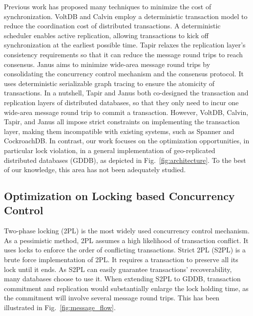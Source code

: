 \documentclass[conference]{IEEEtran}
\begin{document}
Previous work has proposed many techniques
to minimize the cost of synchronization.
VoltDB \cite{VoltDB} and Calvin \cite{Calvin:conf/sigmod/ThomsonDWRSA12} employ a deterministic transaction model
to reduce the coordination cost of distributed transactions.
A deterministic scheduler enables active replication, allowing transactions to kick off synchronization at the earliest possible time.
Tapir \cite{Tapir:conf/sosp/ZhangSSKP15} relaxes the replication layer's consistency requirements so that it can reduce the message round trips to reach consensus.
Janus \cite{Janus:conf/osdi/MuNLL16} aims to minimize wide-area message round trips
by consolidating the concurrency control mechanism and the consensus protocol.
It uses deterministic serializable graph tracing to ensure the atomicity of transactions.
In a nutshell, Tapir and Janus both co-designed the transaction and replication layers of distributed databases, so that they only need to incur one wide-area message round trip to commit a transaction.
However, VoltDB, Calvin, Tapir, and Janus all impose strict constraints on implementing the transaction layer, making them incompatible with existing systems, such as Spanner and CockroachDB.
In contrast, our work focuses on the optimization opportunities, in particular lock violation, in a general implementation of geo-replicated distributed databases (GDDB), as depicted in Fig.~\ref{fig:architecture}.
To the best of our knowledge, this area has not been adequately studied.

\subsection{Optimization on Locking based Concurrency Control}
Two-phase locking (2PL) is the most widely used concurrency control mechanism.
As a pessimistic method, 2PL assumes a high likelihood of transaction conflict.
It uses locks to enforce the order of conflicting transactions.
Strict 2PL (S2PL) is a brute force implementation of 2PL.
It requires a transaction to preserve all its lock until it ends.
As S2PL can easily guarantee transactions' recoverability, many databases choose to use it.
When extending S2PL to GDDB, transaction commitment and replication would substantially enlarge the lock holding time,
as the commitment will involve several message round trips. This has been illustrated in Fig.~\ref{fig:message_flow}.
\end{document}
